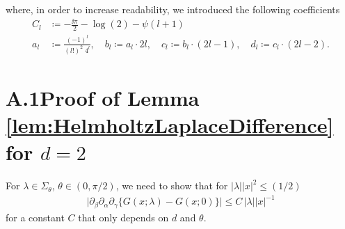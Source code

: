 where, in order to increase readability, we introduced the following coefficients
\begin{align*}
  C_l &\coloneqq -\frac{\ii \pi}{2} - \log(2) - \psi(l + 1) \\
  a_l &\coloneqq \frac{(-1)^l}{(l!)^2 \; 4^l}, \quad
  b_l \coloneqq a_l \cdot  2l, \quad
  c_l \coloneqq b_l \cdot (2l - 1), \quad
  d_l \coloneqq c_l \cdot (2l - 2).
\end{align*}

\section*{A.1\quad Proof of Lemma \ref{lem:HelmholtzLaplaceDifference} for $d = 2$}
\label{sec:A1}

For $\lambda \in \Sigma_\theta$, $\theta \in (0, \pi/2)$, we need to show that for $|\lambda| |x|^2 \leq (1/2)$
\begin{align*}
  \Big| \partial_\beta \partial_\alpha \partial_\gamma \big\{ G(x; \lambda) - G(x; 0) \big\} \Big|
  \leq C\, |\lambda| |x|^{-1}
\end{align*}
for a constant $C$ that only depends on $d$ and $\theta$.

